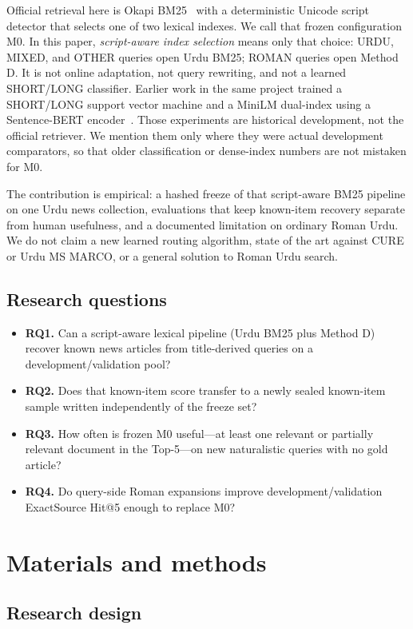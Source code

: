 \documentclass[10pt,letterpaper]{article}
\begin{document}
Official retrieval here is Okapi BM25~\cite{bib13} with a deterministic Unicode script detector that selects one of two lexical indexes. We call that frozen configuration M0. In this paper, \emph{script-aware index selection} means only that choice: URDU, MIXED, and OTHER queries open Urdu BM25; ROMAN queries open Method D. It is not online adaptation, not query rewriting, and not a learned SHORT/LONG classifier. Earlier work in the same project trained a SHORT/LONG support vector machine and a MiniLM dual-index using a Sentence-{BERT} encoder~\cite{bib14}. Those experiments are historical development, not the official retriever. We mention them only where they were actual development comparators, so that older classification or dense-index numbers are not mistaken for M0.

The contribution is empirical: a hashed freeze of that script-aware BM25 pipeline on one Urdu news collection, evaluations that keep known-item recovery separate from human usefulness, and a documented limitation on ordinary Roman Urdu. We do not claim a new learned routing algorithm, state of the art against CURE or Urdu MS MARCO, or a general solution to Roman Urdu search.

\subsection*{Research questions}

\begin{itemize}
\item \textbf{RQ1.} Can a script-aware lexical pipeline (Urdu BM25 plus Method D) recover known news articles from title-derived queries on a development/validation pool?
\item \textbf{RQ2.} Does that known-item score transfer to a newly sealed known-item sample written independently of the freeze set?
\item \textbf{RQ3.} How often is frozen M0 useful---at least one relevant or partially relevant document in the Top-5---on new naturalistic queries with no gold article?
\item \textbf{RQ4.} Do query-side Roman expansions improve development/validation ExactSource Hit@5 enough to replace M0?
\end{itemize}

\section*{Materials and methods}
\subsection*{Research design}
\end{document}
